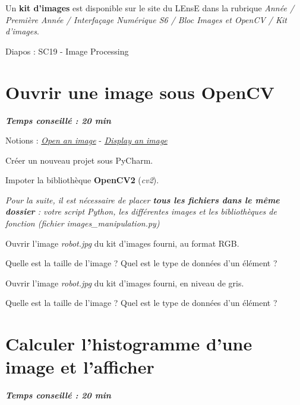 \documentclass[a4paper,11pt,titlepage]{article} %
\begin{document}
Un \textbf{kit d'images} est disponible sur le site du LEnsE dans la rubrique \textit{Année / Première Année / Interfaçage Numérique S6 / Bloc Images et OpenCV / Kit d'images}. 


Diapos : SC19 - Image Processing


\section{Ouvrir une image sous OpenCV}

\begin{center} \textbf{\textit{Temps conseillé : 20 min}} \end{center}

\begin{mdframed}[style=sidebar,frametitle={}]
Notions : \href{https://iogs-lense-training.github.io/image-processing/contents/opencv.html#open-an-image
}{\textit{Open an image}} - \href{https://iogs-lense-training.github.io/image-processing/contents/opencv.html#display-an-image
}{\textit{Display an image}}
\end{mdframed}

\Manip Créer un nouveau projet sous PyCharm.

\Manip Impoter la bibliothèque \textbf{OpenCV2} (\textit{cv2}).

\medskip

\textit{Pour la suite, il est nécessaire de placer \textbf{tous les fichiers dans le même dossier} : votre script Python, les
différentes images et les bibliothèques de fonction (fichier \textsl{images\_manipulation.py})}

\Manip Ouvrir l'image \textsl{robot.jpg} du kit d'images fourni, au format RGB.

\Quest Quelle est la taille de l'image ? Quel est le type de données d'un élément ?

\Manip Ouvrir l'image \textsl{robot.jpg} du kit d'images fourni, en niveau de gris.

\Quest Quelle est la taille de l'image ? Quel est le type de données d'un élément ?


\section{Calculer l'histogramme d'une image et l'afficher}

\begin{center} \textbf{\textit{Temps conseillé : 20 min}} \end{center}
\end{document}
